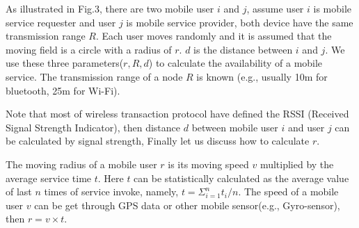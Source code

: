 \documentclass[10pt,journal,compsoc]{IEEEtran}
\begin{document}
As illustrated in Fig.3, there are two mobile user $i$ and $j$, assume user $i$ is mobile service requester and user $j$ is mobile service provider, both device have the same transmission range $R$. Each user moves randomly and it is assumed that the moving field is a circle with a radius of $r$. $d$ is the distance between $i$ and $j$. We use these three parameters($r,R,d$) to calculate the availability of a mobile service. The transmission range of a node $R$ is known (e.g., usually 10m for bluetooth, 25m for Wi-Fi). 

Note that most of wireless transaction protocol have defined the RSSI (Received Signal Strength Indicator), then distance $d$ between mobile user $i$ and user $j$ can be calculated by signal strength, Finally let us discuss how to calculate $r$.


The moving radius of a mobile user $r$ is its moving speed $v$ multiplied by the average service time $t$. Here $t$ can be statistically calculated as the average value of last $n$ times of service invoke, namely, $t = \Sigma_{i=1}^{n}t_i/n$. The speed of a mobile user $v$ can be get through GPS data or other mobile sensor(e.g., Gyro-sensor), then $r = v \times t$.
\end{document}
